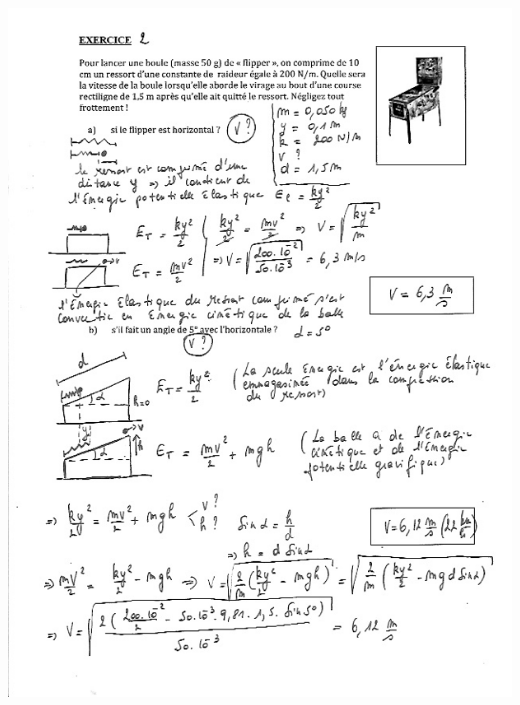  \includegraphics[width=15cm]{COURS2EnergieOHEXERCRESOL-img/COURS2EnergieOHEXERCRESOL-img010.png} 

